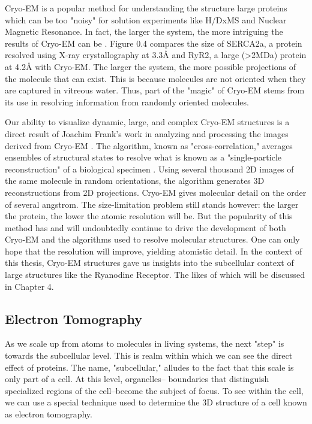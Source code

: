 \documentclass[12pt]{ucsddissertation}
\begin{document}
\begin{dissertationintroduction}
Cryo-EM is a popular method for understanding the structure large proteins which can be too "noisy" for solution experiments like H/DxMS and Nuclear Magnetic Resonance\cite{Ishima2000}. In fact, the larger the system, the more intriguing the results of Cryo-EM can be \cite{Frank1995,Lee2015,Sevvana2018}. Figure 0.4 compares the size of SERCA2a, a protein resolved using X-ray crystallography at 3.3\si{\angstrom} and RyR2, a large (>2MDa) protein at 4.2\si{\angstrom} with Cryo-EM. The larger the system, the more possible projections of the molecule that can exist. This is because molecules are not oriented when they are captured in vitreous water. Thus, part of the "magic" of Cryo-EM stems from its use in resolving information from randomly oriented molecules. 

Our ability to visualize dynamic, large, and complex Cryo-EM structures is a direct result of Joachim Frank's work in analyzing and processing the images derived from Cryo-EM \cite{Frank1970}. The algorithm, known as "cross-correlation," averages ensembles of structural states to resolve what is known as a "single-particle reconstruction" of a biological specimen \cite{Saxton1976}. Using several thousand 2D images of the same molecule in random orientations, the algorithm generates 3D reconstructions from 2D projections\cite{Frank2009}. 
Cryo-EM gives molecular detail on the order of several \si{angstrom}. The size-limitation problem still stands however: the larger the protein, the lower the atomic resolution will be. But the popularity of this method has and will undoubtedly continue to drive the development of both Cryo-EM and the algorithms used to resolve molecular structures. One can only hope that the resolution will improve, yielding atomistic detail. In the context of this thesis, Cryo-EM structures gave us insights into the subcellular context of large structures like the Ryanodine Receptor. The likes of which will be discussed in Chapter 4. 

\subsection{Electron Tomography}
As we scale up from atoms to molecules in living systems, the next "step" is towards the subcellular level. This is realm within which we can see the direct effect of proteins. The name, "subcellular," alludes to the fact that this scale is only part of a cell. At this level, organelles-- boundaries that distinguish specialized regions of the cell--become the subject of focus. To see within the cell, we can use a special technique used to determine the 3D structure of a cell known as electron tomography. 


\end{dissertationintroduction}
\end{document}
